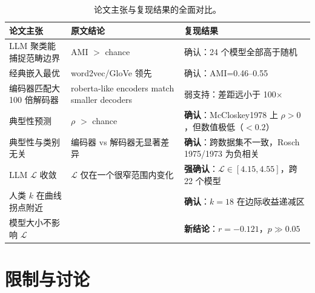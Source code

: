 \documentclass[11pt,a4paper]{article}
\begin{document}
\begin{table}[H]\centering
\begin{tabular}{lp{7.5cm}p{5.5cm}}
\toprule
\textbf{论文主张} & \textbf{原文结论} & \textbf{复现结果}\\
\midrule
LLM 聚类能捕捉范畴边界 & AMI $>$ chance & 确认：24 个模型全部高于随机\\
经典嵌入最优 & word2vec/GloVe 领先 & 确认：AMI=0.46--0.55\\
编码器匹配大 100 倍解码器 & roberta-like encoders match smaller decoders & 弱支持：差距远小于 100$\times$\\
典型性预测 & $\rho$ $>$ chance & \textbf{确认}：McCloskey1978 上 $\rho>0$，但数值极低（$<0.2$）\\
典型性与类别无关 & 编码器 vs 解码器无显著差异 & \textbf{确认}：跨数据集不一致，Rosch 1975/1973 为负相关\\
LLM $\mathcal{L}$ 收敛 & $\mathcal{L}$ 仅在一个很窄范围内变化 & \textbf{强确认}：$\mathcal{L}\in[4.15,4.55]$，跨 22 个模型\\
人类 $k$ 在曲线拐点附近 & & \textbf{确认}：$k=18$ 在边际收益递减区\\
模型大小不影响 $\mathcal{L}$ & & \textbf{新结论}：$r=-0.121$，$p\gg0.05$\\
\bottomrule
\end{tabular}
\caption{论文主张与复现结果的全面对比。}
\end{table}

\section{限制与讨论}
\end{document}

